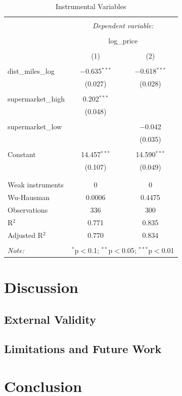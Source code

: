 \documentclass{article}
\begin{document}
\begin{table}[H] \centering 
  \caption{Instrumental Variables} 
  \label{} 
\begin{tabular}{@{\extracolsep{5pt}}lcc} 
\\[-1.8ex]\hline 
\hline \\[-1.8ex] 
 & \multicolumn{2}{c}{\textit{Dependent variable:}} \\ 
\cline{2-3} 
\\[-1.8ex] & \multicolumn{2}{c}{log\_price} \\ 
\\[-1.8ex] & (1) & (2)\\ 
\hline \\[-1.8ex] 
 dist\_miles\_log & $-$0.635$^{***}$ & $-$0.618$^{***}$ \\ 
  & (0.027) & (0.028) \\ 
  & & \\ 
 supermarket\_high & 0.202$^{***}$ &  \\ 
  & (0.048) &  \\ 
  & & \\ 
 supermarket\_low &  & $-$0.042 \\ 
  &  & (0.035) \\ 
  & & \\ 
 Constant & 14.457$^{***}$ & 14.590$^{***}$ \\ 
  & (0.107) & (0.049) \\ 
  & & \\ 
\hline \\[-1.8ex] 
Weak instruments & 0 & 0 \\ 
Wu-Hausman & 0.0006 & 0.4475 \\ 
Observations & 336 & 300 \\ 
R$^{2}$ & 0.771 & 0.835 \\ 
Adjusted R$^{2}$ & 0.770 & 0.834 \\ 
\hline 
\hline \\[-1.8ex] 
\textit{Note:}  & \multicolumn{2}{r}{$^{*}$p$<$0.1; $^{**}$p$<$0.05; $^{***}$p$<$0.01} \\ 
\end{tabular} 
\end{table} 


\section{Discussion}
\subsection{External Validity}
\subsection{Limitations and Future Work}

\section{Conclusion}

\newpage
\nocite{*}
  

\end{document}
